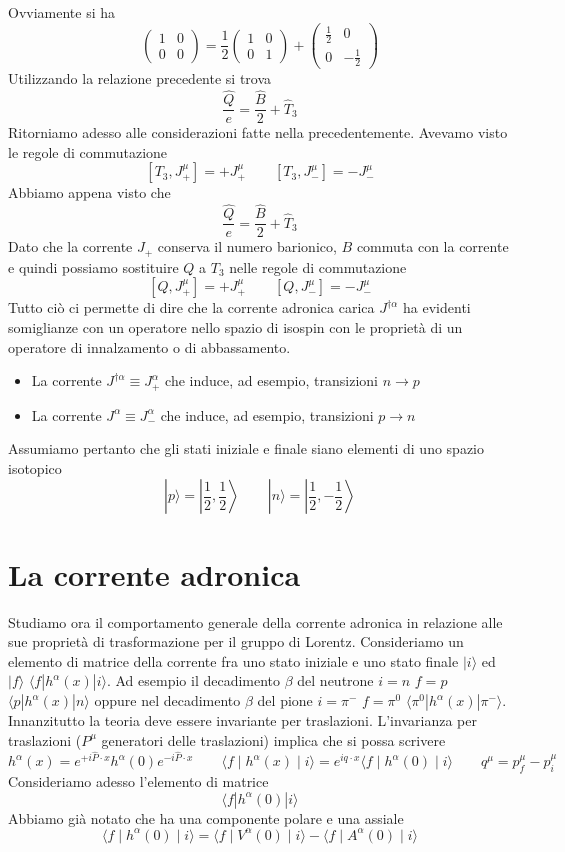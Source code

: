 Ovviamente si ha
$$
\begin{pmatrix} 1 & 0 \\ 0 & 0 \end{pmatrix} = \frac{1}{2} \begin{pmatrix} 1 & 0 \\ 0 & 1 \end{pmatrix} + \begin{pmatrix} \frac{1}{2} & 0 \\ 0 & -\frac{1}{2} \end{pmatrix}
$$
Utilizzando la relazione precedente si trova
$$
\frac{\widehat{Q}}{e} = \frac{\widehat{B}}{2} + \widehat{T}_3
$$
Ritorniamo adesso alle considerazioni fatte nella precedentemente. Avevamo visto le regole di commutazione
$$
[T_3, J_+^\mu] = +J_+^\mu \quad \quad [T_3, J_-^\mu] = -J_-^\mu
$$
Abbiamo appena visto che
$$
\frac{\widehat{Q}}{e} = \frac{\widehat{B}}{2} + \widehat{T}_3
$$
Dato che la corrente $J_+$ conserva il numero barionico, $B$ commuta con la corrente e quindi possiamo sostituire $Q$ a $T_3$ nelle regole di commutazione
$$
[Q, J_+^\mu] = +J_+^\mu \quad \quad [Q, J_-^\mu] = -J_-^\mu
$$
Tutto ciò ci permette di dire che la corrente adronica carica $J^{\dagger\alpha}$ ha evidenti somiglianze con un operatore nello spazio di isospin con le proprietà di un operatore di innalzamento o di abbassamento.
\begin{itemize}
	\item La corrente $J^{\dagger\alpha}\equiv J_+^\alpha$ che induce, ad esempio, transizioni $n\to p$
	\item La corrente $J^\alpha\equiv J_-^\alpha$ che induce, ad esempio, transizioni $p\to n$
\end{itemize}
Assumiamo pertanto che gli stati iniziale e finale siano elementi di uno spazio isotopico
$$
|p\rangle = \left|\frac{1}{2}, \frac{1}{2}\right\rangle \quad \quad |n\rangle = \left|\frac{1}{2}, -\frac{1}{2}\right\rangle
$$
\section{La corrente adronica}
Studiamo ora il comportamento generale della corrente adronica in relazione alle sue proprietà di trasformazione per il gruppo di Lorentz. Consideriamo un elemento di matrice della corrente fra uno stato iniziale e uno stato finale $|i\rangle$ ed $|f\rangle$ $\langle f|h^\alpha(x)|i\rangle$. Ad esempio il decadimento $\beta$ del neutrone $i=n$ $f=p$ $\langle p|h^\alpha(x)|n\rangle$ oppure nel decadimento $\beta$ del pione $i=\pi^-$ $f=\pi^0$ $\langle \pi^0|h^\alpha(x)|\pi^-\rangle$. Innanzitutto la teoria deve essere invariante per traslazioni. L'invarianza per traslazioni ($P^\mu$ generatori delle traslazioni) implica che si possa scrivere
$$
h^\alpha (x) = e^{+i\widehat{P}\cdot x} h^\alpha (0) e^{-i\widehat{P}\cdot x} \qquad \langle f \mid h^\alpha (x) \mid i \rangle = e^{iq \cdot x} \langle f \mid h^\alpha (0) \mid i \rangle \quad \quad q^\mu = p_f^\mu - p_i^\mu
$$
Consideriamo adesso l'elemento di matrice
$$
\langle f|h^\alpha(0)|i\rangle
$$
Abbiamo già notato che ha una componente polare e una assiale
$$
\langle f \mid h^\alpha(0) \mid i \rangle = \langle f \mid V^\alpha(0) \mid i \rangle - \langle f \mid A^\alpha(0) \mid i \rangle
$$
